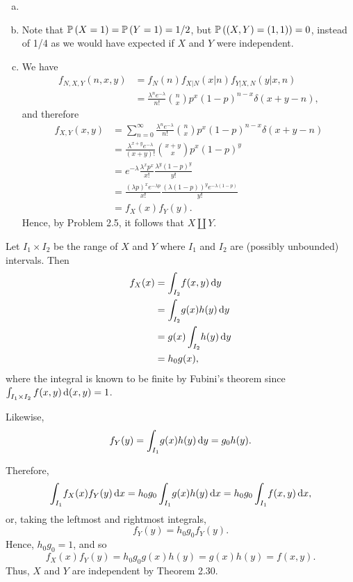 \begin{ex}
  \begin{enumerate}[(a)]
    \item[]
    \item Note that $\P{X=1}=\P{Y=1}=1/2$, but $\P{(X,Y)=(1,1)}=0$, instead of
          1/4 as we would have expected if $X$ and $Y$ were independent.
    \item We have
          \begin{align*}
            f_{N,X,Y}(n,x,y)
             & =f_{N}(n)f_{X|N}(x|n)f_{Y|X,N}(y|x,n)                                      \\
             & =\frac{\lambda^n e^{-\lambda}}{n!}\binom{n}{x}p^x(1-p)^{n-x}\delta(x+y-n),
          \end{align*}
          and therefore
          \begin{align*}
            f_{X,Y}(x,y)
             & =\sum_{n=0}^\infty\frac{\lambda^n e^{-\lambda}}{n!}\binom{n}{x}p^x(1-p)^{n-x}\delta(x+y-n) \\
             & =\frac{\lambda^{x+y} e^{-\lambda}}{(x+y)!}\binom{x+y}{x}p^x(1-p)^y                         \\
             & =e^{-\lambda}\frac{\lambda^x p^x}{x!} \frac{\lambda^y (1-p)^y}{y!}                         \\
             & =\frac{(\lambda p)^xe^{-\lambda p}}{x!} \frac{(\lambda(1-p))^ye^{-\lambda (1-p)}}{y!}      \\
             & = f_X(x)f_Y(y).
          \end{align*}
          Hence, by Problem 2.5, it follows that $X\amalg Y$.
  \end{enumerate}
\end{ex}

\begin{ex}
  Let $I_1\times I_2$ be the range of $X$ and $Y$ where $I_1$ and $I_2$ are
  (possibly unbounded) intervals. Then
  \begin{align*}
    f_X(x)
     & =\int_{I_2}\!f(x, y)\,\d{y}  \\
     & =\int_{I_2}\!g(x)h(y)\,\d{y} \\
     & =g(x)\int_{I_2}\!h(y)\,\d{y} \\
     & =h_0g(x),
  \end{align*}
  where the integral is known to be finite by Fubini's theorem since
  $\int_{I_1\times I_2}f(x,y)\,\d{(x,y)}=1$.

  Likewise,
  \[
    f_Y(y)
    =\int_{I_1}\!g(x)h(y)\,\d{y}
    =g_0h(y).
  \]

  Therefore,
  \[
    \int_{I_1}\!f_X(x)f_Y(y)\,\d{x}
    =h_0g_0\int_{I_1}\!g(x)h(y)\,\d{x}
    =h_0g_0\int_{I_1}\!f(x,y)\,\d{x},
  \]
  or, taking the leftmost and rightmost integrals,
  \[
    f_Y(y)=h_0g_0f_Y(y).
  \]
  Hence, $h_0g_0=1$, and so
  \[
    f_X(x)f_Y(y)=h_0g_0 g(x)h(y)=g(x)h(y)=f(x,y).
  \]
  Thus, $X$ and $Y$ are independent by Theorem 2.30.
\end{ex}

